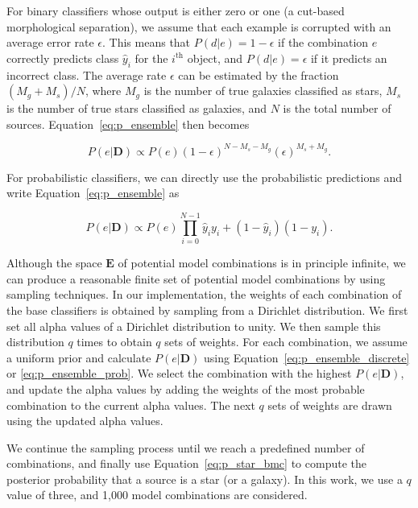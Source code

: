 For binary classifiers whose output is either zero or one
(\eg a cut-based morphological separation),
we assume that each example is corrupted with
an average error rate $\epsilon$.
This means that
$P\left(d|e\right) = 1-\epsilon$ if the combination $e$
correctly predicts class $\hat{y}_i$ for the $i^{\text{th}}$ object,
and $P\left(d|e\right) = \epsilon$ if it predicts an incorrect class.
The average rate $\epsilon$ can be estimated by
the fraction $\left(M_g + M_s\right) / N$,
where $M_g$ is the number of true galaxies classified as stars,
$M_s$ is the number of true stars classified as galaxies,
and $N$ is the total number of sources.
Equation~\ref{eq:p_ensemble} then becomes

\begin{equation} \label{eq:p_ensemble_discrete}
  P \left( e | \mathbf{D} \right) \propto 
  P \left( e \right) \left(1 - \epsilon \right)^{N - M_s - M_g}
  \left( \epsilon \right)^{M_s + M_g}.
\end{equation}

\noindent
For probabilistic classifiers,
we can directly use the probabilistic predictions
and write Equation~\ref{eq:p_ensemble} as

\begin{equation} \label{eq:p_ensemble_prob}
  P \left( e | \mathbf{D} \right) \propto 
  P \left( e \right) \prod_{i=0}^{N-1}
  \hat{y}_i y_i + 
  \left(1 - \hat{y}_i\right) \left(1 - y_i\right).
\end{equation}


Although the space $\mathbf{E}$ of potential model combinations
is in principle infinite,
we can produce a reasonable finite set
of potential model combinations by using sampling techniques.
In our implementation,
the weights of each combination of the base classifiers
is obtained by sampling from a Dirichlet distribution.
We first set all alpha values of a Dirichlet distribution to unity.
We then sample this distribution $q$ times
to obtain $q$ sets of weights.
For each combination,
we assume a uniform prior and
calculate $P\left(e|\mathbf{D}\right)$ using
Equation~\ref{eq:p_ensemble_discrete} or \ref{eq:p_ensemble_prob}.
We select the combination with the highest $P\left(e|\mathbf{D}\right)$,
and update the alpha values by
adding the weights of the most probable combination
to the current alpha values.
The next $q$ sets of weights are drawn
using the updated alpha values.

We continue the sampling process until
we reach a predefined number of combinations,
and finally use Equation~\ref{eq:p_star_bmc} to compute
the posterior probability that a source is a star (or a galaxy).
In this work, we use a $q$ value of three,
and 1,000 model combinations are considered.


